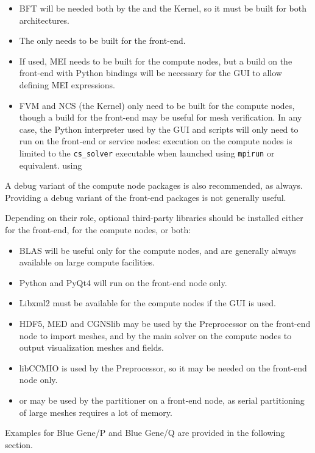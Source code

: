 \documentclass[a4paper,10pt,twoside]{article}
\begin{document}
\begin{itemize}
\item BFT will be needed both by the \pcs and the Kernel, so it must
      be built for both architectures.
\item The \pcs only needs to be built for the front-end.
\item If used, MEI needs to be built for the compute nodes,
      but a build on the front-end with Python bindings will be necessary
      for the GUI to allow defining MEI expressions.
\item FVM and NCS (the Kernel) only need to be built for the compute nodes,
      though a build for the front-end may be useful for mesh verification.
      In any case, the Python interpreter used by the GUI and scripts
      will only need to run on the front-end or service nodes:
      execution on the compute nodes is limited to the \texttt{cs\_solver}
      executable when launched using \texttt{mpirun} or equivalent.
      using 
\end{itemize}

A debug variant of the compute node packages is also recommended, as always.
Providing a debug variant of the front-end packages is not generally useful.

Depending on their role, optional third-party libraries should be installed
either for the front-end, for the compute nodes, or both:

\begin{itemize}
\item BLAS will be useful only for the compute nodes, and are generally
      always available on large compute facilities.
\item Python and PyQt4 will run on the front-end node only.
\item Libxml2 must be available for the compute nodes if the GUI is used.
\item HDF5, MED and CGNSlib may be used by the Preprocessor on the front-end node
      to import meshes, and by the main solver on the compute nodes
      to output visualization meshes and fields.
\item libCCMIO is used by the Preprocessor, so it may be needed on the
      front-end node only.
\item \scotch or \metis may be used by the partitioner on a front-end
      node, as serial partitioning of large meshes requires a lot of memory.
\end{itemize}

Examples for Blue Gene/P and Blue Gene/Q are provided in the following section.
\end{document}
